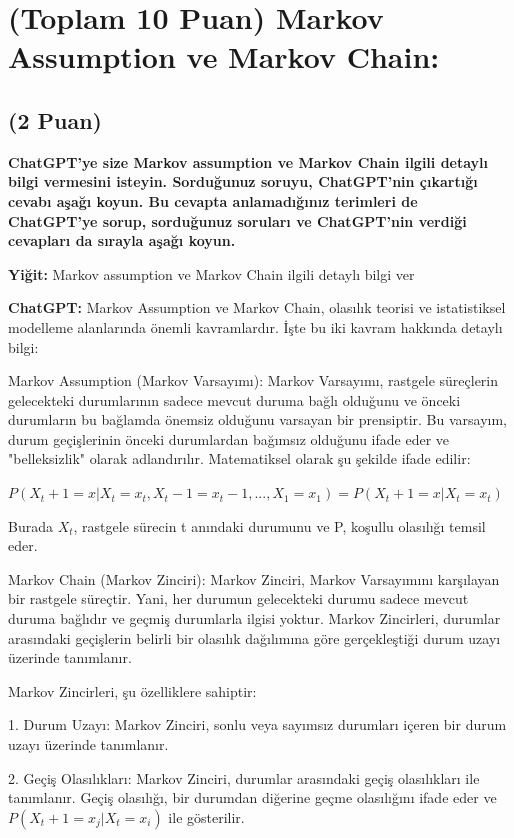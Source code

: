 \documentclass[11pt]{article}
\begin{document}
\section{(Toplam 10 Puan) Markov Assumption ve Markov Chain:}

\subsection{(2 Puan)} \textbf{ChatGPT’ye size Markov assumption ve Markov Chain ilgili detaylı bilgi vermesini isteyin. Sorduğunuz soruyu, ChatGPT'nin çıkartığı cevabı aşağı koyun. Bu cevapta anlamadığınız terimleri de ChatGPT’ye sorup, sorduğunuz soruları ve ChatGPT’nin verdiği cevapları da sırayla aşağı koyun.}

\textbf{Yiğit:} Markov assumption ve Markov Chain ilgili detaylı bilgi ver

\textbf{ChatGPT:} Markov Assumption ve Markov Chain, olasılık teorisi ve istatistiksel modelleme alanlarında önemli kavramlardır. İşte bu iki kavram hakkında detaylı bilgi:

Markov Assumption (Markov Varsayımı):
Markov Varsayımı, rastgele süreçlerin gelecekteki durumlarının sadece mevcut duruma bağlı olduğunu ve önceki durumların bu bağlamda önemsiz olduğunu varsayan bir prensiptir. Bu varsayım, durum geçişlerinin önceki durumlardan bağımsız olduğunu ifade eder ve "belleksizlik" olarak adlandırılır. Matematiksel olarak şu şekilde ifade edilir:

$P(X_t+1 = x | X_t = x_t, X_t-1 = x_t-1, ..., X_1 = x_1) = P(X_t+1 = x | X_t = x_t)$

Burada $X_t$, rastgele sürecin t anındaki durumunu ve P, koşullu olasılığı temsil eder.

Markov Chain (Markov Zinciri):
Markov Zinciri, Markov Varsayımını karşılayan bir rastgele süreçtir. Yani, her durumun gelecekteki durumu sadece mevcut duruma bağlıdır ve geçmiş durumlarla ilgisi yoktur. Markov Zincirleri, durumlar arasındaki geçişlerin belirli bir olasılık dağılımına göre gerçekleştiği durum uzayı üzerinde tanımlanır.

Markov Zincirleri, şu özelliklere sahiptir:

1. Durum Uzayı: Markov Zinciri, sonlu veya sayımsız durumları içeren bir durum uzayı üzerinde tanımlanır.

2. Geçiş Olasılıkları: Markov Zinciri, durumlar arasındaki geçiş olasılıkları ile tanımlanır. Geçiş olasılığı, bir durumdan diğerine geçme olasılığını ifade eder ve $P(X_t+1 = x_j | X_t = x_i)$ ile gösterilir.
\end{document}
